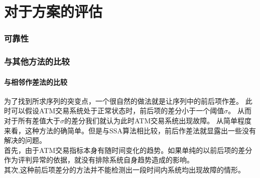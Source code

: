\documentclass[a4paper]{article}
\begin{document}
\part{对于方案的评估}
\section{可靠性}
\section{与其他方法的比较}
\subsection{与相邻作差法的比较}
\indent 为了找到所求序列的突变点，一个很自然的做法就是让序列中的前后项作差。
此时可以假设ATM交易系统处于正常状态时，前后项的差分小于一个阈值$\sigma$。
从而对于所有差值大于$\sigma$的差分我们就认为此时ATM交易系统出现故障。
从简单程度来看，这种方法的确简单。但是与SSA算法相比较，前后作差法就显露出一些没有解决的问题。\\
\indent 首先，由于ATM交易指标本身有随时间变化的趋势。如果单纯的以前后项的差分作为评判异常的依据，就没有排除系统自身趋势造成的影响。\\
\indent 其次,这种前后项差分的方法并不能检测出一段时间内系统均出现故障的情形。
\end{document}
